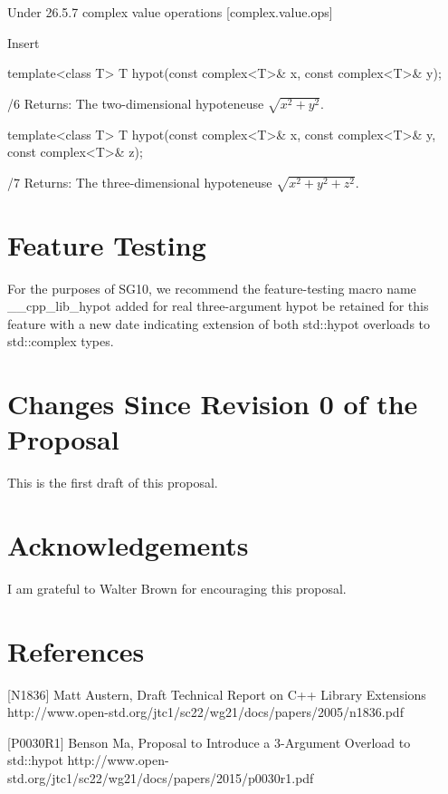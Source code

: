 \documentclass[ebook,10pt,oneside,openany,final]{memoir}
\begin{document}
Under
26.5.7	complex value operations	[complex.value.ops]

Insert

\begin{codeblock}
    template<class T> T hypot(const complex<T>\& x, const complex<T>\& y);
\end{codeblock}
/6	Returns: The two-dimensional hypoteneuse $\sqrt{x^2 + y^2}$.

\begin{codeblock}
    template<class T> T hypot(const complex<T>\& x, const complex<T>\& y, const complex<T>\& z);
\end{codeblock}
/7	Returns: The three-dimensional hypoteneuse $\sqrt{x^2 + y^2 + z^2}$.


\section{Feature Testing}

For the purposes of SG10, we recommend the feature-testing macro name __cpp_lib_hypot
added for real three-argument hypot be retained for this feature with a new date indicating
extension of both std::hypot overloads to std::complex types.


\section{Changes Since Revision 0 of the Proposal}

This is the first draft of this proposal.


\section{Acknowledgements}

I am grateful to Walter Brown for encouraging this proposal.


\section{References}

[N1836] Matt Austern, Draft Technical Report on C++ Library Extensions
http://www.open-std.org/jtc1/sc22/wg21/docs/papers/2005/n1836.pdf

[P0030R1] Benson Ma, Proposal to Introduce a 3-Argument Overload to std::hypot
http://www.open-std.org/jtc1/sc22/wg21/docs/papers/2015/p0030r1.pdf
\end{document}
